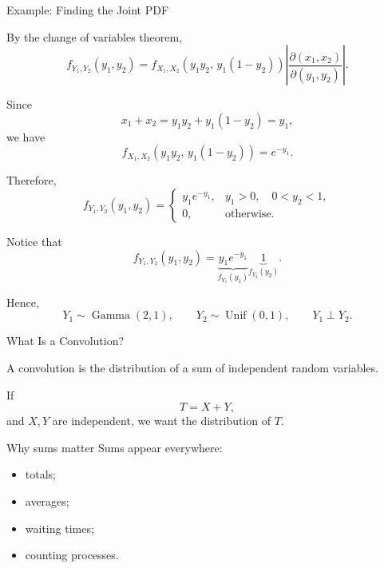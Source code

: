 \begin{frame}{Example: Finding the Joint PDF}

\small

By the change of variables theorem,
\[
f_{Y_1,Y_2}(y_1,y_2)
=
f_{X_1,X_2}
\left(
y_1y_2,\,
y_1(1-y_2)
\right)
\left|
\frac{\partial(x_1,x_2)}
{\partial(y_1,y_2)}
\right|.
\]

Since
\[
x_1+x_2
=
y_1y_2+y_1(1-y_2)
=
y_1,
\]
we have
\[
f_{X_1,X_2}
\left(
y_1y_2,\,
y_1(1-y_2)
\right)
=
e^{-y_1}.
\]

Therefore,
\[
{
f_{Y_1,Y_2}(y_1,y_2)
=
\begin{cases}
y_1e^{-y_1},
& y_1>0,\quad 0<y_2<1,\\[4pt]
0,
& \text{otherwise}.
\end{cases}
}
\]

Notice that
\[
f_{Y_1,Y_2}(y_1,y_2)
=
\underbrace{y_1e^{-y_1}}_{f_{Y_1}(y_1)}
\underbrace{1}_{f_{Y_2}(y_2)}.
\]

Hence,
\[
{
Y_1\sim\operatorname{Gamma}(2,1),
\qquad
Y_2\sim\operatorname{Unif}(0,1),
\qquad
Y_1\perp Y_2.
}
\]

\end{frame}








\begin{frame}{What Is a Convolution?}

A convolution is the distribution of a sum of independent random variables.

If
\[
T=X+Y,
\]
and $X,Y$ are independent, we want the distribution of $T$.

\vspace{0.25cm}

\begin{keybox}{Why sums matter}
Sums appear everywhere:
\begin{itemize}
    \item totals;
    \item averages;
    \item waiting times;
    \item counting processes.
\end{itemize}
\end{keybox}

\end{frame}



